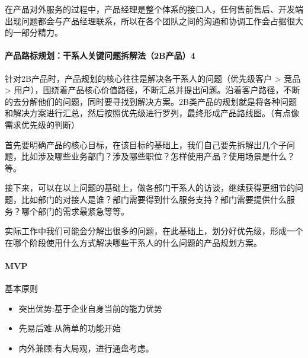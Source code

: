 \documentclass[letterpaper,11pt,english]{sphinxmanual}
\begin{document}
在产品对外服务的过程中，产品经理是整个体系的接口人，任何售前售后、开发端出现问题都会与产品经理联系，所以在各个团队之间的沟通和协调工作会占据很大的一部分精力。


\paragraph{产品路标规划：干系人关键问题拆解法（2B产品）4\sphinxfootnotemark[56]}
\label{\detokenize{chapter_introduction/2B:b-4}}%
\begin{footnotetext}[56]\sphinxAtStartFootnote
{}
%
\end{footnotetext}\ignorespaces 
针对2B产品时，产品规划的核心往往是解决各干系人的问题（优先级客户 > 竞品
>
用户），围绕着产品核心价值路径，不断汇总并提出问题。沿着客户路径，不断的去分解他们的问题，同时要寻找到解决方案。2B类产品的规划就是将各种问题和解决方案进行汇总，然后按照优先级进行罗列，最终形成产品路线图。（有点像需求优先级的判断）

首先要明确产品的核心目标，在该目标的基础上，我们自己要先拆解出几个子问题，比如涉及哪些业务部门？涉及哪些职位？怎样使用产品？使用场景是什么？等。

接下来，可以在以上问题的基础上，做各部门干系人的访谈，继续获得更细节的问题，比如部门的对接人是谁？部门需要得到什么服务支持？部门需要提供什么服务？哪个部门的需求最紧急等等。

实际工作中我们可能会分解出很多的问题，在此基础上，划分好优先级，形成一个在哪个阶段使用什么方式解决哪些干系人的什么问题的产品规划方案。


\paragraph{MVP}
\label{\detokenize{chapter_introduction/2B:mvp}}
基本原则 %
\begin{footnote}[57]\sphinxAtStartFootnote
{}
%
\end{footnote}
\begin{itemize}
\item {} 
突出优势:基于企业自身当前的能力优势

\item {} 
先易后难:从简单的功能开始

\item {} 
内外兼顾:有大局观，进行通盘考虑。

\end{itemize}
\end{document}
